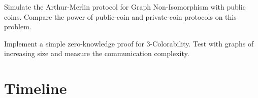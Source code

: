 \begin{exercise}[Computational]
Simulate the Arthur-Merlin protocol for Graph Non-Isomorphism with public coins. Compare the power of public-coin and private-coin protocols on this problem.
\end{exercise}

\begin{exercise}[Computational]
Implement a simple zero-knowledge proof for 3-Colorability. Test with graphs of increasing size and measure the communication complexity.
\end{exercise}

\section{Timeline}
\label{sec:ip:timeline}

